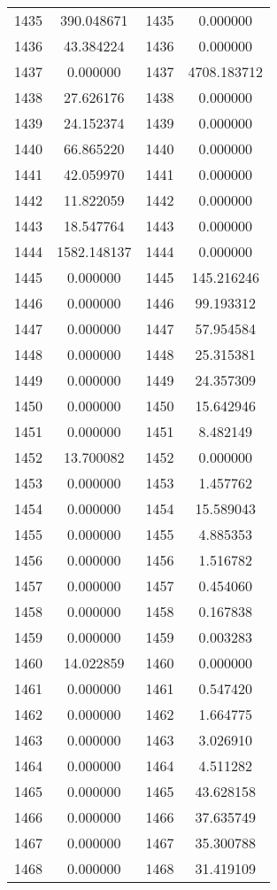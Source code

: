 \documentclass[12pt]{article}
\begin{document}
\begin{longtable}{@{}cccc@{}}
1435 & 390.048671 & 1435 & 0.000000 \\
1436 & 43.384224 & 1436 & 0.000000 \\
1437 & 0.000000 & 1437 & 4708.183712 \\
1438 & 27.626176 & 1438 & 0.000000 \\
1439 & 24.152374 & 1439 & 0.000000 \\
1440 & 66.865220 & 1440 & 0.000000 \\
1441 & 42.059970 & 1441 & 0.000000 \\
1442 & 11.822059 & 1442 & 0.000000 \\
1443 & 18.547764 & 1443 & 0.000000 \\
1444 & 1582.148137 & 1444 & 0.000000 \\
1445 & 0.000000 & 1445 & 145.216246 \\
1446 & 0.000000 & 1446 & 99.193312 \\
1447 & 0.000000 & 1447 & 57.954584 \\
1448 & 0.000000 & 1448 & 25.315381 \\
1449 & 0.000000 & 1449 & 24.357309 \\
1450 & 0.000000 & 1450 & 15.642946 \\
1451 & 0.000000 & 1451 & 8.482149 \\
1452 & 13.700082 & 1452 & 0.000000 \\
1453 & 0.000000 & 1453 & 1.457762 \\
1454 & 0.000000 & 1454 & 15.589043 \\
1455 & 0.000000 & 1455 & 4.885353 \\
1456 & 0.000000 & 1456 & 1.516782 \\
1457 & 0.000000 & 1457 & 0.454060 \\
1458 & 0.000000 & 1458 & 0.167838 \\
1459 & 0.000000 & 1459 & 0.003283 \\
1460 & 14.022859 & 1460 & 0.000000 \\
1461 & 0.000000 & 1461 & 0.547420 \\
1462 & 0.000000 & 1462 & 1.664775 \\
1463 & 0.000000 & 1463 & 3.026910 \\
1464 & 0.000000 & 1464 & 4.511282 \\
1465 & 0.000000 & 1465 & 43.628158 \\
1466 & 0.000000 & 1466 & 37.635749 \\
1467 & 0.000000 & 1467 & 35.300788 \\
1468 & 0.000000 & 1468 & 31.419109 \\

\end{longtable}
\end{document}
